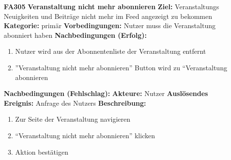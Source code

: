 \documentclass[parskip=full]{scrartcl}
\begin{document}
\begin{itemize}[nosep]
						
			\item[\textbf{FA305}]\textbf{Veranstaltung nicht mehr abonnieren}
			\newline \textbf{Ziel:} Veranstaltungs Neuigkeiten und Beiträge nicht mehr im \gls{Feed} angezeigt zu bekommen
			\newline \textbf{Kategorie:} primär
			\newline \textbf{Vorbedingungen:} Nutzer muss die Veranstaltung abonniert haben
			\newline \textbf{Nachbedingungen (Erfolg):} 
			\begin{enumerate}[nosep]
				\item Nutzer wird aus der Abonnentenliste der Veranstaltung entfernt
				\item ”Veranstaltung nicht mehr abonnieren” Button wird zu “Veranstaltung abonnieren 
			\end{enumerate}
			\textbf{Nachbedingungen (Fehlschlag):}
			\newline \textbf{Akteure:} Nutzer
			\newline \textbf{Auslösendes Ereignis:} Anfrage des Nutzers
			\newline \textbf{Beschreibung:}
			\begin{enumerate}[nosep]
				\item Zur Seite der Veranstaltung navigieren
				\item “Veranstaltung nicht mehr abonnieren” klicken
				\item  Aktion bestätigen\\
			\end{enumerate}
						

\end{itemize}
\end{document}
